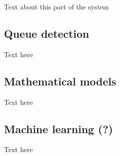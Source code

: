Text about this part of the system

\subsection{Queue detection}
Text here

\subsection{Mathematical models}
Text here

\subsection{Machine learning (?)}
Text here
